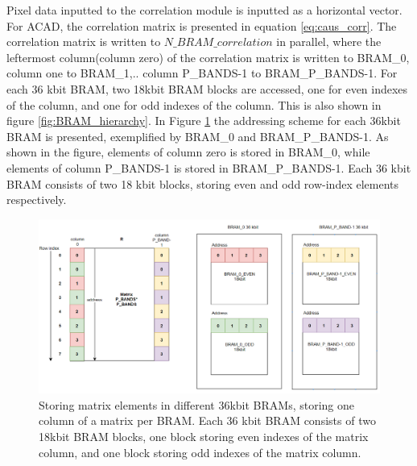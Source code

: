 Pixel data inputted to the correlation module is inputted as a horizontal vector. For ACAD, the correlation matrix is presented in equation \ref{eq:caus_corr}. The correlation matrix is written to $N\_BRAM\_correlation$ in parallel, where the leftermost column(column zero) of the correlation matrix is written to BRAM\_0, column one to BRAM\_1,.. column P\_BANDS-1 to BRAM\_P\_BANDS-1. For each 36 kbit BRAM, two 18kbit BRAM blocks are accessed, one for even indexes of the column, and one for odd indexes of the column. This is also shown in figure \ref{fig:BRAM_hierarchy}. In Figure \ref{fig:BRAM_matrix} the addressing scheme for each 36kbit BRAM is presented, exemplified by BRAM\_0 and BRAM\_P\_BANDS-1. As shown in the figure, elements of column zero is stored in BRAM\_0, while elements of column P\_BANDS-1 is stored in BRAM\_P\_BANDS-1. Each 36 kbit BRAM consists of two 18 kbit blocks, storing even and odd row-index elements respectively. 




\begin{figure}[H]
\centering
   \includegraphics[scale=0.5]{images/bram_addressing_matrix.PNG}
  \caption{Storing matrix elements in different 36kbit BRAMs, storing one column of a matrix per BRAM. Each 36 kbit BRAM consists of two 18kbit BRAM blocks, one block storing even indexes of the matrix column, and one block storing odd indexes of the matrix column.    } 
  \label{fig:BRAM_matrix}
\end{figure}





